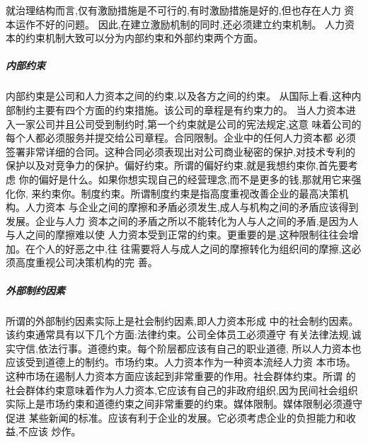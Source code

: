就治理结构而言,仅有激励措施是不可行的,有时激励措施是好的,但也存在人力
资本运作不好的问题。 因此,在建立激励机制的同时,还必须建立约束机制。 人力资
本的约束机制大致可以分为内部约束和外部约束两个方面。

\subparagraph{内部约束}
内部约束是公司和人力资本之间的约束,以及各方之间的约束。
从国际上看,这种内部制约主要有四个方面的约束措施。该公司的章程是有约束力的。
当人力资本进入一家公司并且公司受到制约时,第一个约束就是公司的宪法规定,这意
味着公司的每个人都必须服务并提交给公司章程。合同限制。企业中的任何人力资本都
必须签署非常详细的合同。这种合同必须表现出对公司商业秘密的保护,对技术专利的
保护以及对竞争力的保护。偏好约束。所谓的偏好约束,就是我想约束你,首先要考虑
你的偏好是什么。如果你想实现自己的经营理念,而不是更多的钱,那就用它来强化你,
来约束你。制度约束。所谓制度约束是指高度重视改善企业的最高决策机构。人力资本
与企业之间的摩擦和矛盾必须发生,成人与机构之间的矛盾应该得到发展。企业与人力
资本之间的矛盾之所以不能转化为人与人之间的矛盾,是因为人与人之间的摩擦难以使
人力资本受到正常的约束。更重要的是,这种限制往往会增加。在个人的好恶之中,往
往需要将人与成人之间的摩擦转化为组织间的摩擦,这必须高度重视公司决策机构的完
善。

\subparagraph{外部制约因素}
所谓的外部制约因素实际上是社会制约因素,即人力资本形成
中的社会制约因素。该约束通常具有以下几个方面:法律约束。公司全体员工必须遵守
有关法律法规,诚实守信,依法行事。道德约束。每个阶层都应该有自己的职业道德,
所以人力资本也应该受到道德上的制约。市场约束。人力资本作为一种资本流经人力资
本市场。这种市场在遏制人力资本方面应该起到非常重要的作用。社会群体约束。所谓
的社会群体约束意味着作为人力资本,它应该有自己的非政府组织,因为民间社会组织
实际上是市场约束和道德约束之间非常重要的约束。媒体限制。媒体限制必须遵守促进
某些新闻的标准。应该有利于企业的发展。它必须考虑企业的负担能力和收益,不应该
炒作。
